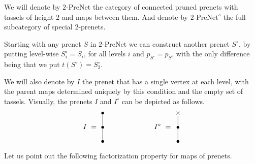 \documentclass[letterpaper,12pt,leqno]{article}
\numberwithin{equation}{theorem}
\def\PreNet{\textrm{-}\mathrm{PreNet}}
\begin{document}
We will denote by $2\PreNet$ the category of connected pruned prenets with tassels of height $2$ and maps between them. And denote by $2\PreNet^s$ the full
subcategory of special $2$-prenets.

\begin{nparagraph}
Starting with any prenet $S$ in $2\PreNet$ we can construct another prenet $S^\circ$, by putting level-wise $S^\circ_i = S_i$, for all levels $i$ and $p_{S^\circ} = p_S$, with the
only difference being that we put $t(S^\circ) = S^\circ_2$.

We will also denote by $I$ the prenet that has a single vertex at each level, with the parent maps determined uniquely by this condition and the empty set of tassels. Visually,
the prenets $I$ and $I^\circ$ can be depicted as follows.
$$
I \ =\  
\begin{tikzpicture}[inner sep=0pt,baseline=(a11.base)]
\def\u{2em}
\node (a21) at (0, 0) {$\bullet$};
\node (a11) at (0, -1*\u) {$\bullet$};
\node (a01) at (0, -2*\u) {$\bullet$};

\draw (a21) -- (a11) -- (a01);
\end{tikzpicture}
\hskip 7em
I^\circ \ =\  
\begin{tikzpicture}[inner sep=0pt,baseline=(a11.base)]
\def\u{2em}
\node (a21) at (0, 0) {$\cross$};
\node (a11) at (0, -1*\u) {$\bullet$};
\node (a01) at (0, -2*\u) {$\bullet$};

\draw (a21) -- (a11) -- (a01);
\end{tikzpicture}
$$

Let us point out the following factorization property for maps of prenets.
\end{nparagraph}
\end{document}
